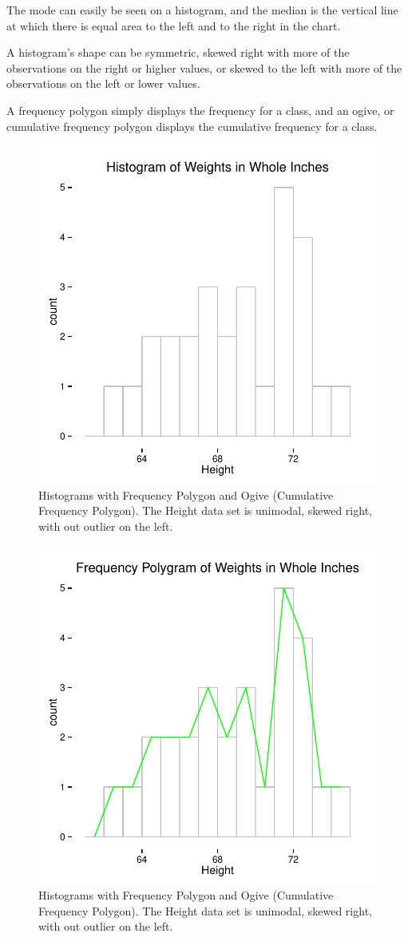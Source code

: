\documentclass[nohyper,justified]{tufte-handout}\usepackage[]{graphicx}\usepackage[]{color}
\newenvironment{knitrout}{}{} %
\begin{document}
The mode can easily be seen on a histogram, and the median is the vertical line at which there is equal area to the left and to the right in the chart. 

A histogram's shape can be symmetric, skewed right with more of the observations on the right or higher values, or skewed to the left with more of the observations on the left or lower values.

A frequency polygon simply displays the frequency for a class, and an ogive, or cumulative frequency polygon displays the cumulative frequency for a class. 

\begin{knitrout}
\color{fgcolor}\begin{figure}

{\centering \includegraphics[width=.49\linewidth]{figure/graphics-histogram-1} 

}

\caption[Histograms with Frequency Polygon and Ogive (Cumulative Frequency Polygon)]{Histograms with Frequency Polygon and Ogive (Cumulative Frequency Polygon). The Height data set is unimodal, skewed right, with out outlier on the left. }\label{fig:histogram1}
\end{figure}

\begin{figure}

{\centering \includegraphics[width=.49\linewidth]{figure/graphics-histogram-2} 

}

\caption[Histograms with Frequency Polygon and Ogive (Cumulative Frequency Polygon)]{Histograms with Frequency Polygon and Ogive (Cumulative Frequency Polygon). The Height data set is unimodal, skewed right, with out outlier on the left. }\label{fig:histogram2}
\end{figure}


\end{knitrout}
\end{document}
